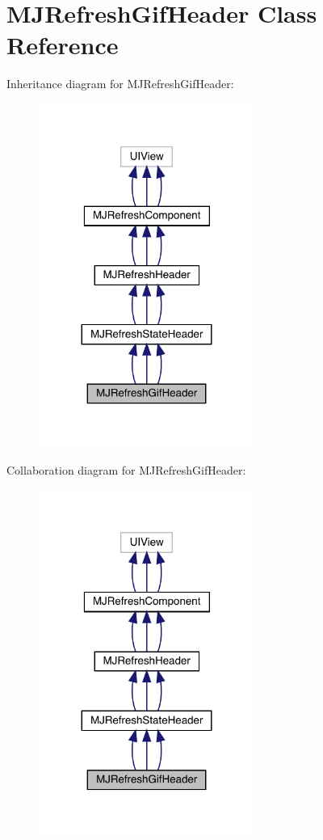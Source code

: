 \hypertarget{interface_m_j_refresh_gif_header}{}\section{M\+J\+Refresh\+Gif\+Header Class Reference}
\label{interface_m_j_refresh_gif_header}


Inheritance diagram for M\+J\+Refresh\+Gif\+Header\+:\nopagebreak
\begin{figure}[H]
\begin{center}
\leavevmode
\includegraphics[width=200pt]{interface_m_j_refresh_gif_header__inherit__graph}
\end{center}
\end{figure}


Collaboration diagram for M\+J\+Refresh\+Gif\+Header\+:\nopagebreak
\begin{figure}[H]
\begin{center}
\leavevmode
\includegraphics[width=200pt]{interface_m_j_refresh_gif_header__coll__graph}
\end{center}
\end{figure}
